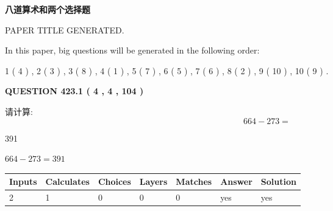\documentclass{ctexart}
\begin{document}
   
 \vspace{0.2in}
{\LARGE {\textbf{ 八道算术和两个选择题}}}
   
   
 PAPER TITLE GENERATED.
   
   
   
\vspace{0.2in}
   
In this paper, big questions will be generated in the following order: 
   
   
   1 ( 4 )
 ,
   2 ( 3 )
 ,
   3 ( 8 )
 ,
   4 ( 1 )
 ,
   5 ( 7 )
 ,
   6 ( 5 )
 ,
   7 ( 6 )
 ,
   8 ( 2 )
 ,
   9 ( 10 )
 ,
   10 ( 9 )
 .
  
\vspace{0.2in}
  
{\textbf{\Large{QUESTION
423.1 
 ( 4 , 4 , 104 )
}}}
  
  
 
请计算:
\begin{equation}
664 -   %
273 = \nonumber
\end{equation}
 
 
 
\noindent{}
 
 

391
 
 
\noindent{}
 
 

 
 
 
\noindent{}
 
 

$ %
664 -  %
273=   %
391$
 
 
\noindent{}
 
 

 
   
   
   
   
\noindent\begin{tabular}{|l|l|l|l|l|l|l|}
 \hline
Inputs & Calculates & Choices & Layers & Matches & Answer & Solution \\ \hline
 2  & 
 1  & 
 0
  & 
 0  & 
 0  & 
  yes & 
  yes 
  \\ \hline
 \end{tabular}
   
   
   
\end{document}
